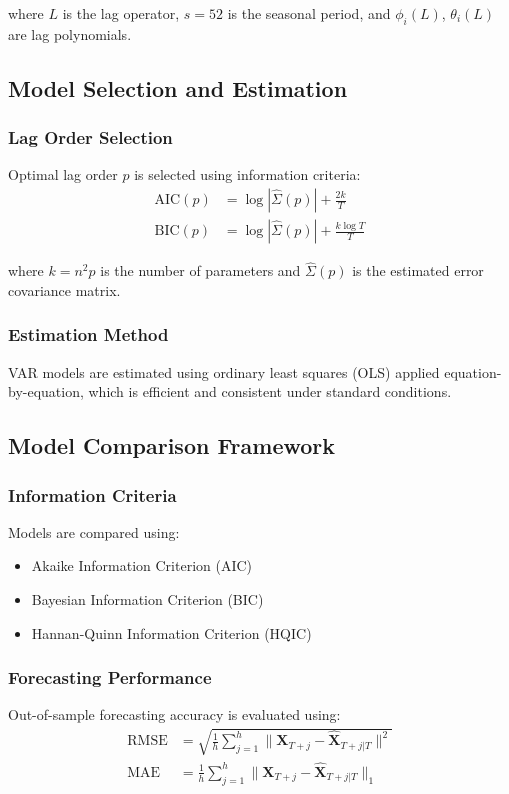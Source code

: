 where $L$ is the lag operator, $s=52$ is the seasonal period, and $\phi_i(L)$, $\theta_i(L)$ are lag polynomials.

\subsection{Model Selection and Estimation}

\subsubsection{Lag Order Selection}
Optimal lag order $p$ is selected using information criteria:
\begin{align}
\text{AIC}(p) &= \log|\hat{{\Sigma}}(p)| + \frac{2k}{T} \label{eq:aic}\\
\text{BIC}(p) &= \log|\hat{{\Sigma}}(p)| + \frac{k \log T}{T} \label{eq:bic}
\end{align}

where $k = n^2 p$ is the number of parameters and $\hat{{\Sigma}}(p)$ is the estimated error covariance matrix.

\subsubsection{Estimation Method}
VAR models are estimated using ordinary least squares (OLS) applied equation-by-equation, which is efficient and consistent under standard conditions.

\subsection{Model Comparison Framework}

\subsubsection{Information Criteria}
Models are compared using:
\begin{itemize}
\item Akaike Information Criterion (AIC)
\item Bayesian Information Criterion (BIC)  
\item Hannan-Quinn Information Criterion (HQIC)
\end{itemize}

\subsubsection{Forecasting Performance}
Out-of-sample forecasting accuracy is evaluated using:
\begin{align}
\text{RMSE} &= \sqrt{\frac{1}{h}\sum_{j=1}^{h} \|\mathbf{X}_{T+j} - \hat{\mathbf{X}}_{T+j|T}\|^2} \label{eq:rmse}\\
\text{MAE} &= \frac{1}{h}\sum_{j=1}^{h} \|\mathbf{X}_{T+j} - \hat{\mathbf{X}}_{T+j|T}\|_1 \label{eq:mae}
\end{align}

